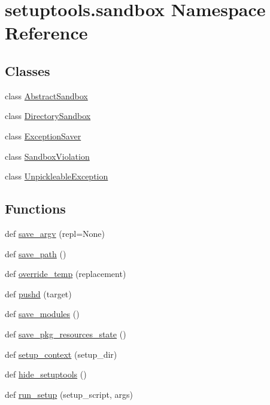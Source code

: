 \hypertarget{namespacesetuptools_1_1sandbox}{}\section{setuptools.\+sandbox Namespace Reference}
\label{namespacesetuptools_1_1sandbox}
\subsection*{Classes}
\begin{DoxyCompactItemize}
\item 
class \hyperlink{classsetuptools_1_1sandbox_1_1_abstract_sandbox}{Abstract\+Sandbox}
\item 
class \hyperlink{classsetuptools_1_1sandbox_1_1_directory_sandbox}{Directory\+Sandbox}
\item 
class \hyperlink{classsetuptools_1_1sandbox_1_1_exception_saver}{Exception\+Saver}
\item 
class \hyperlink{classsetuptools_1_1sandbox_1_1_sandbox_violation}{Sandbox\+Violation}
\item 
class \hyperlink{classsetuptools_1_1sandbox_1_1_unpickleable_exception}{Unpickleable\+Exception}
\end{DoxyCompactItemize}
\subsection*{Functions}
\begin{DoxyCompactItemize}
\item 
def \hyperlink{namespacesetuptools_1_1sandbox_a2a79966d30bf09df3b132b92a596738c}{save\+\_\+argv} (repl=None)
\item 
def \hyperlink{namespacesetuptools_1_1sandbox_a057c8a6e653446a00924ea4809b63dc6}{save\+\_\+path} ()
\item 
def \hyperlink{namespacesetuptools_1_1sandbox_a2c4ba056356a14d170e0b4b60fd02580}{override\+\_\+temp} (replacement)
\item 
def \hyperlink{namespacesetuptools_1_1sandbox_a7971928fb0fbf584da85d366379232d3}{pushd} (target)
\item 
def \hyperlink{namespacesetuptools_1_1sandbox_a03b1ef3f49621d5d24d9847920d2a71a}{save\+\_\+modules} ()
\item 
def \hyperlink{namespacesetuptools_1_1sandbox_a7f34d1ea59a8595bed11a0c2f0e84aef}{save\+\_\+pkg\+\_\+resources\+\_\+state} ()
\item 
def \hyperlink{namespacesetuptools_1_1sandbox_a52b79978a4d33340bc744648198b5a87}{setup\+\_\+context} (setup\+\_\+dir)
\item 
def \hyperlink{namespacesetuptools_1_1sandbox_a2866b4e88f03f6075fed0f7a530261c3}{hide\+\_\+setuptools} ()
\item 
def \hyperlink{namespacesetuptools_1_1sandbox_ac27deefbd9b5163ee6861eb07b93bc23}{run\+\_\+setup} (setup\+\_\+script, args)
\end{DoxyCompactItemize}
